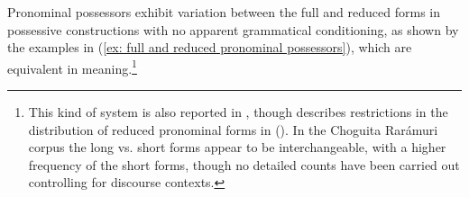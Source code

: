        \newpage
    \z
\z

Pronominal possessors exhibit variation between the full and reduced forms in possessive constructions with no apparent grammatical conditioning, as shown by the examples in (\ref{ex: full and reduced pronominal possessors}), which are equivalent in meaning.\footnote{This kind of system is also reported in , though \citet{moralesmoreno2016rochecahi} describes restrictions in the distribution of reduced pronominal forms in  (\citeyear[72]{moralesmoreno2016rochecahi}). In the Choguita Rarámuri corpus the long vs. short forms appear to be interchangeable, with a higher frequency of the short forms, though no detailed counts have been carried out controlling for discourse contexts.}

